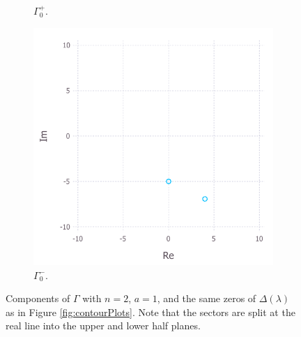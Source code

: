 \documentclass[12pt, oneside, a4paper]{article}
\begin{document}
\begin{figure}[htpb!]
\begin{subfigure}{.5\textwidth}
        \caption{$\Gamma_0^+$.}
    \end{subfigure}
    \begin{subfigure}{.5\textwidth}
        \centering
        \includegraphics[width=1\linewidth]{contourPlot_n=2_a=1_gamma0Minus_cropped.pdf}
        \caption{$\Gamma_0^-$.}
    \end{subfigure}
    \caption{Components of $\Gamma$ with $n=2$, $a=1$, and the same zeros of $\Delta(\lambda)$ as in Figure \ref{fig:contourPlots}. Note that the sectors are split at the real line into the upper and lower half planes.}
    \label{fig:contourPlot_n=2}
\end{figure}

\end{document}
